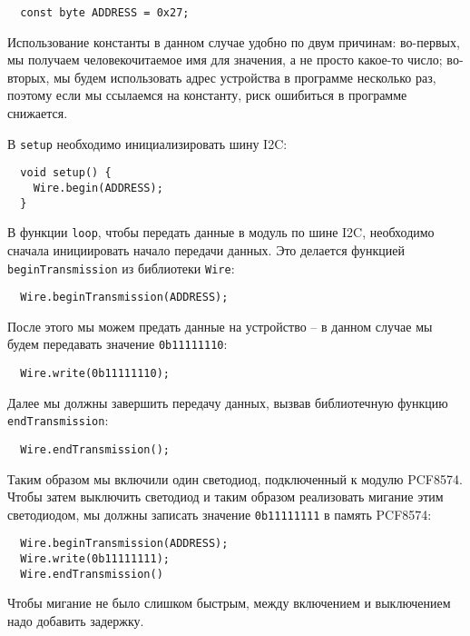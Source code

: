 \documentclass[../sparc.tex]{subfiles}
\begin{document}
\begin{verbatim}
  const byte ADDRESS = 0x27;
\end{verbatim}

Использование константы в данном случае удобно по двум причинам: во-первых, мы
получаем человекочитаемое имя для значения, а не просто какое-то число;
во-вторых, мы будем использовать адрес устройства в программе несколько раз,
поэтому если мы ссылаемся на константу, риск ошибиться в программе снижается.

В \texttt{setup} необходимо инициализировать шину I2C:

\begin{verbatim}
  void setup() {
    Wire.begin(ADDRESS);
  }
\end{verbatim}

В функции \texttt{loop}, чтобы передать данные в модуль по шине I2C, необходимо
сначала инициировать начало передачи данных.  Это делается функцией
\texttt{beginTransmission} из библиотеки \texttt{Wire}:

\begin{verbatim}
  Wire.beginTransmission(ADDRESS);
\end{verbatim}

После этого мы можем предать данные на устройство -- в данном случае мы будем
передавать значение \texttt{0b11111110}:

\begin{verbatim}
  Wire.write(0b11111110);
\end{verbatim}

Далее мы должны завершить передачу данных, вызвав библиотечную функцию
\texttt{endTransmission}:

\begin{verbatim}
  Wire.endTransmission();
\end{verbatim}

Таким образом мы включили один светодиод, подключенный к модулю PCF8574.  Чтобы
затем выключить светодиод и таким образом реализовать мигание этим светодиодом,
мы должны записать значение \texttt{0b11111111} в память PCF8574:

\begin{verbatim}
  Wire.beginTransmission(ADDRESS);
  Wire.write(0b11111111);
  Wire.endTransmission()
\end{verbatim}

Чтобы мигание не было слишком быстрым, между включением и выключением надо
добавить задержку.
\end{document}
